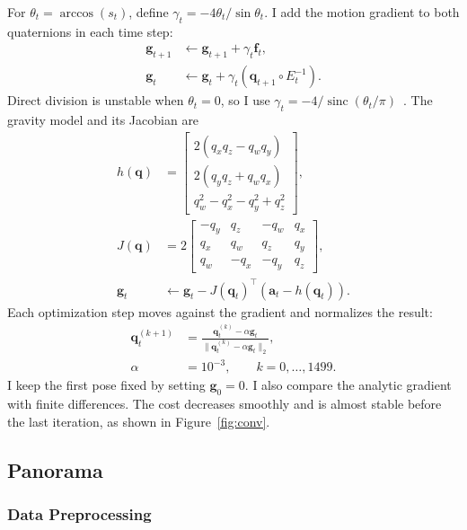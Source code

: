 \documentclass[letterpaper, 10pt, conference]{ieeeconf}
\newcommand{\q}{\mathbf{q}}
\DeclareMathOperator{\sinc}{sinc}
\begin{document}
For $\theta_t=\arccos(s_t)$, define
$\gamma_t=-4\theta_t/\sin\theta_t$. I add the motion gradient to both
quaternions in each time step:
\begin{equation}
\begin{aligned}
\mathbf g_{t+1}&\leftarrow
\mathbf g_{t+1}+\gamma_t\mathbf f_t,\\
\mathbf g_t&\leftarrow
\mathbf g_t+\gamma_t(\q_{t+1}\circ E_t^{-1}).
\end{aligned}
\label{eq:motiongrad}
\end{equation}
Direct division is unstable when $\theta_t=0$, so I use
$\gamma_t=-4/\sinc(\theta_t/\pi)$~\cite{numpy}. The gravity model and its
Jacobian are
\begin{equation}
\begin{aligned}
h(\q)&=\begin{bmatrix}
2(q_xq_z-q_wq_y)\\
2(q_yq_z+q_wq_x)\\
q_w^2-q_x^2-q_y^2+q_z^2
\end{bmatrix},\\
J(\q)&=2\begin{bmatrix}
-q_y&q_z&-q_w&q_x\\
q_x&q_w&q_z&q_y\\
q_w&-q_x&-q_y&q_z
\end{bmatrix},\\
\mathbf g_t&\leftarrow\mathbf g_t-J(\q_t)^\top
(\mathbf a_t-h(\q_t)).
\end{aligned}
\label{eq:obsgrad}
\end{equation}
Each optimization step moves against the gradient and normalizes the result:
\begin{equation}
\begin{aligned}
\q^{(k+1)}_t
&=\frac{\q^{(k)}_t-\alpha\mathbf g_t}
{\|\q^{(k)}_t-\alpha\mathbf g_t\|_2},\\
\alpha&=10^{-3},\qquad k=0,\ldots,1499.
\end{aligned}
\label{eq:pgd}
\end{equation}
I keep the first pose fixed by setting $\mathbf g_0=0$. I also compare the
analytic gradient with finite differences. The cost decreases smoothly and is
almost stable before the last iteration, as shown in Figure~\ref{fig:conv}.

\subsection{Panorama}

\subsubsection{Data Preprocessing}
\end{document}
